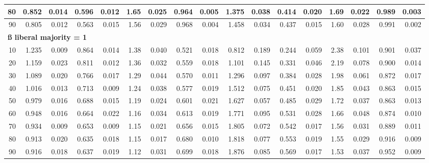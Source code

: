 \documentclass[
]{article}
\begin{document}
\begin{table}[H]
\begin{table}
{\begin{tabular}{r|r|r|r|r|r|r|r|r|r|r|r|r|r|r|r|r}
\hline
\hspace{1em}80 & 0.852 & 0.014 & 0.596 & 0.012 & 1.65 & 0.025 & 0.964 & 0.005 & 1.375 & 0.038 & 0.414 & 0.020 & 1.69 & 0.022 & 0.989 & 0.003\\
\hline
\hspace{1em}90 & 0.805 & 0.012 & 0.563 & 0.015 & 1.56 & 0.029 & 0.968 & 0.004 & 1.458 & 0.034 & 0.437 & 0.015 & 1.60 & 0.028 & 0.991 & 0.002\\
\hline
\multicolumn{17}{l}{\textbf{ß liberal majority = 1}}\\
\hline
\hspace{1em}10 & 1.235 & 0.009 & 0.864 & 0.014 & 1.38 & 0.040 & 0.521 & 0.018 & 0.812 & 0.189 & 0.244 & 0.059 & 2.38 & 0.101 & 0.901 & 0.037\\
\hline
\hspace{1em}20 & 1.159 & 0.023 & 0.811 & 0.012 & 1.36 & 0.032 & 0.559 & 0.018 & 1.101 & 0.145 & 0.331 & 0.046 & 2.19 & 0.078 & 0.900 & 0.014\\
\hline
\hspace{1em}30 & 1.089 & 0.020 & 0.766 & 0.017 & 1.29 & 0.044 & 0.570 & 0.011 & 1.296 & 0.097 & 0.384 & 0.028 & 1.98 & 0.061 & 0.872 & 0.017\\
\hline
\hspace{1em}40 & 1.016 & 0.013 & 0.713 & 0.009 & 1.24 & 0.038 & 0.577 & 0.019 & 1.512 & 0.075 & 0.451 & 0.020 & 1.85 & 0.043 & 0.863 & 0.015\\
\hline
\hspace{1em}50 & 0.979 & 0.016 & 0.688 & 0.015 & 1.19 & 0.024 & 0.601 & 0.021 & 1.627 & 0.057 & 0.485 & 0.029 & 1.72 & 0.037 & 0.863 & 0.013\\
\hline
\hspace{1em}60 & 0.948 & 0.016 & 0.664 & 0.022 & 1.16 & 0.034 & 0.613 & 0.019 & 1.771 & 0.095 & 0.531 & 0.028 & 1.66 & 0.048 & 0.874 & 0.010\\
\hline
\hspace{1em}70 & 0.934 & 0.009 & 0.653 & 0.009 & 1.15 & 0.021 & 0.656 & 0.015 & 1.805 & 0.072 & 0.542 & 0.017 & 1.56 & 0.031 & 0.889 & 0.011\\
\hline
\hspace{1em}80 & 0.913 & 0.020 & 0.635 & 0.018 & 1.15 & 0.017 & 0.680 & 0.010 & 1.818 & 0.077 & 0.553 & 0.019 & 1.55 & 0.029 & 0.916 & 0.009\\
\hline
\hspace{1em}90 & 0.916 & 0.018 & 0.637 & 0.019 & 1.12 & 0.031 & 0.699 & 0.018 & 1.876 & 0.085 & 0.569 & 0.017 & 1.53 & 0.037 & 0.952 & 0.009\\

\end{tabular}}
\end{table}
\end{table}
\end{document}
